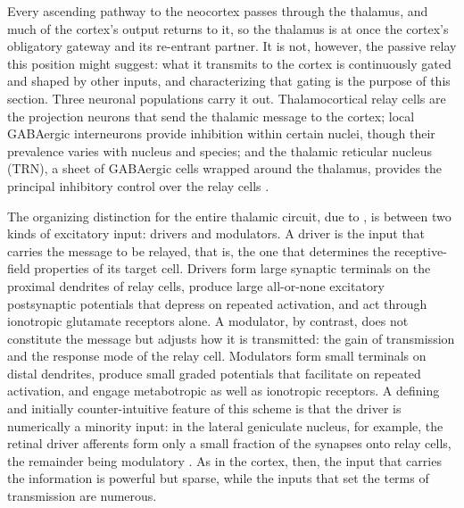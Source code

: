 Every ascending pathway to the neocortex passes through the thalamus, and much of the cortex's output returns to it, so the thalamus 
is at once the cortex's obligatory gateway and its re-entrant partner. It is not, however, the passive relay this position might 
suggest: what it transmits to the cortex is continuously gated and shaped by other inputs, and characterizing that gating is the 
purpose of this section. Three neuronal populations carry it out. Thalamocortical relay cells are the projection neurons that send 
the thalamic message to the cortex; local GABAergic interneurons provide inhibition within certain nuclei, though their prevalence 
varies with nucleus and species; and the thalamic reticular nucleus (TRN), a sheet of GABAergic cells wrapped around the thalamus, 
provides the principal inhibitory control over the relay cells \parencite{sherman2013, shepherd2018}.

The organizing distinction for the entire thalamic circuit, due to \textcite{sherman1998}, is between two kinds of excitatory input: 
drivers and modulators. A driver is the input that carries the message to be relayed, that is, the one that determines the receptive-field 
properties of its target cell. Drivers form large synaptic terminals on the proximal dendrites of relay cells, produce large 
all-or-none excitatory postsynaptic potentials that depress on repeated activation, and act through ionotropic glutamate receptors 
alone. A modulator, by contrast, does not constitute the message but adjusts how it is transmitted: the gain of transmission and the 
response mode of the relay cell. Modulators form small terminals on distal dendrites, produce small graded potentials that facilitate 
on repeated activation, and engage metabotropic as well as ionotropic receptors. A defining and initially counter-intuitive feature of 
this scheme is that the driver is numerically a minority input: in the lateral geniculate nucleus, for example, the retinal driver 
afferents form only a small fraction of the synapses onto relay cells, the remainder being modulatory 
\parencite{sherman1998, sherman2013}. As in the cortex, then, the input that carries the information is powerful but sparse, while the 
inputs that set the terms of transmission are numerous.

